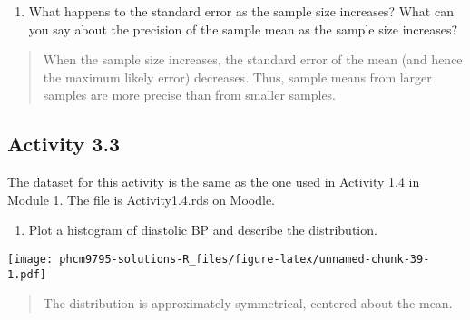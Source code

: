 \documentclass[
]{memoir}
\newenvironment{Shaded}{\begin{snugshade}}{\end{snugshade}}
\newcommand{\AttributeTok}[1]{\textcolor[rgb]{0.77,0.63,0.00}{#1}}
\newcommand{\FunctionTok}[1]{\textcolor[rgb]{0.00,0.00,0.00}{#1}}
\newcommand{\NormalTok}[1]{#1}
\newcommand{\OtherTok}[1]{\textcolor[rgb]{0.56,0.35,0.01}{#1}}
\newcommand{\SpecialCharTok}[1]{\textcolor[rgb]{0.00,0.00,0.00}{#1}}
\newcommand{\StringTok}[1]{\textcolor[rgb]{0.31,0.60,0.02}{#1}}
\providecommand{\tightlist}{%
  \setlength{\itemsep}{0pt}\setlength{\parskip}{0pt}}
\begin{document}
\begin{enumerate}
\def\labelenumi{\alph{enumi})}
\setcounter{enumi}{1}
\tightlist
\item
  What happens to the standard error as the sample size increases? What can you say about the precision of the sample mean as the sample size increases?
\end{enumerate}

\begin{quote}
When the sample size increases, the standard error of the mean (and hence the maximum likely error) decreases. Thus, sample means from larger samples are more precise than from smaller samples.
\end{quote}

\hypertarget{activity-3.3}{%
\subsection*{Activity 3.3}\label{activity-3.3}}

The dataset for this activity is the same as the one used in Activity 1.4 in Module 1. The file is Activity1.4.rds on Moodle.

\begin{enumerate}
\def\labelenumi{\alph{enumi})}
\tightlist
\item
  Plot a histogram of diastolic BP and describe the distribution.
\end{enumerate}

\begin{Shaded}
\end{Shaded}

\texttt{[image: phcm9795-solutions-R\_files/figure-latex/unnamed-chunk-39-1.pdf]}

\begin{quote}
The distribution is approximately symmetrical, centered about the mean.
\end{quote}
\end{document}
